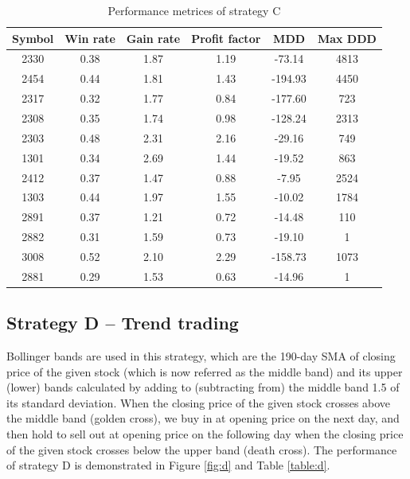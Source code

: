 \documentclass[12pt, letterpaper, oneside]{article}
\begin{document}
\begin{table}[h!]
    \centering
    \begin{tabular}{ |c|c|c|c|c|c| }
        \hline
        Symbol & Win rate & Gain rate & Profit factor & MDD & Max DDD \\ [0.5ex]
        \hline
        2330 & 0.38 & 1.87 & 1.19 & -73.14 & 4813 \\
        2454 & 0.44 & 1.81 & 1.43 & -194.93 & 4450 \\
        2317 & 0.32 & 1.77 & 0.84 & -177.60 & 723 \\
        2308 & 0.35 & 1.74 & 0.98 & -128.24 & 2313 \\
        2303 & 0.48 & 2.31 & 2.16 & -29.16 & 749 \\
        1301 & 0.34 & 2.69 & 1.44 & -19.52 & 863 \\
        2412 & 0.37 & 1.47 & 0.88 & -7.95 & 2524 \\
        1303 & 0.44 & 1.97 & 1.55 & -10.02 & 1784 \\
        2891 & 0.37 & 1.21 & 0.72 & -14.48 & 110 \\
        2882 & 0.31 & 1.59 & 0.73 & -19.10 & 1 \\
        3008 & 0.52 & 2.10 & 2.29 & -158.73 & 1073 \\
        2881 & 0.29 & 1.53 & 0.63 & -14.96 & 1 \\ [0.5ex]
        \hline
    \end{tabular}
    \caption{Performance metrices of strategy C}
    \label{table:c}
\end{table}

\subsection{Strategy D -- Trend trading}
Bollinger bands are used in this strategy, which are the 190-day SMA of closing price of the given stock (which is now referred as the middle band) and its upper (lower) bands calculated by adding to (subtracting from) the middle band 1.5 of its standard deviation. When the closing price of the given stock crosses above the middle band (golden cross), we buy in at opening price on the next day, and then hold to sell out at opening price on the following day when the closing price of the given stock crosses below the upper band (death cross). The performance of strategy D is demonstrated in Figure \ref{fig:d} and Table \ref{table:d}.
\end{document}
